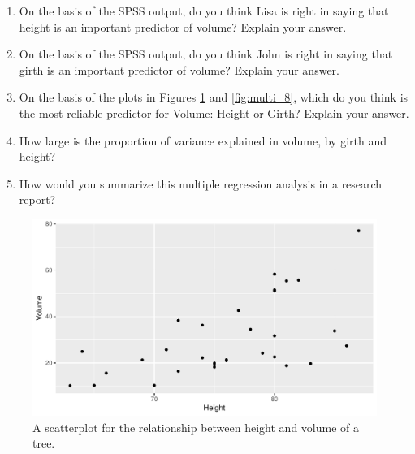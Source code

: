 \documentclass[]{report}\usepackage[]{graphicx}\usepackage[]{color}
\makeatletter
\def\maxwidth{ %
  \ifdim\Gin@nat@width>\linewidth
    \linewidth
  \else
    \Gin@nat@width
  \fi
}
\newenvironment{knitrout}{}{} %
\makeatother
\begin{document}
\begin{enumerate}
\item On the basis of the SPSS output, do you think Lisa is right in saying that height is an important predictor of volume? Explain your answer.

\item On the basis of the SPSS output, do you think John is right in saying that girth is an important predictor of volume? Explain your answer.

\item On the basis of the plots in Figures \ref{fig:multi_7} and \ref{fig:multi_8}, which do you think is the most reliable predictor for Volume: Height or Girth? Explain your answer.

\item How large is the proportion of variance explained in volume, by girth and height?

\item How would you summarize this multiple regression analysis in a research report?

\end{enumerate}

\begin{knitrout}
\color{fgcolor}\begin{figure}

{\centering \includegraphics[width=\maxwidth]{figure/multi_7-1} 

}

\caption[A scatterplot for the relationship between height and volume of a tree]{A scatterplot for the relationship between height and volume of a tree.}\label{fig:multi_7}
\end{figure}


\end{knitrout}
\end{document}
